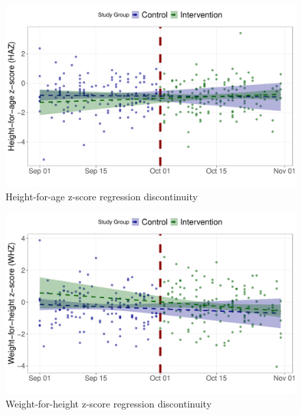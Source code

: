 \documentclass[12pt,a4paper]{article}
\begin{document}
\begin{figure}[H]

{\centering \includegraphics{kayahReport_files/figure-latex/rd3a-1} 

}

\caption{Height-for-age z-score regression discontinuity}\label{fig:rd3a}
\end{figure}

\begin{figure}[H]

{\centering \includegraphics{kayahReport_files/figure-latex/rd4a-1} 

}

\caption{Weight-for-height z-score regression discontinuity}\label{fig:rd4a}
\end{figure}
\end{document}
